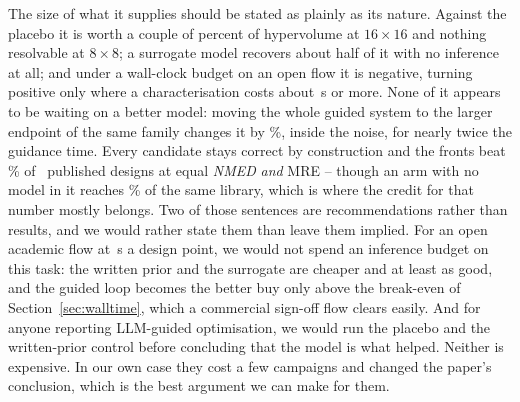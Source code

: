 \documentclass[acmsmall,review,anonymous]{acmart}
\newcommand{\nmed}{\textit{NMED}}
\begin{document}
The size of what it supplies should be stated as plainly as its nature.
Against the placebo it is worth a couple of percent of hypervolume at
$16\times16$ and nothing resolvable at $8\times8$; a surrogate model recovers
about half of it with no inference at all; and under a wall-clock budget on an
open flow it is negative, turning positive only where a characterisation costs
about \BreakEvenNSGA\,s or more.  None of it appears to be waiting on a better
model: moving the whole guided system to the larger endpoint of the same family
changes it by \ProFull\%, inside the noise, for nearly twice the guidance time.  Every candidate stays correct by construction
and the fronts beat \SotaSixteenADP\% of \NrefSixteen\ published designs at
equal \nmed{} \emph{and} MRE -- though an arm with no model in it reaches
\SotaShamSixteenADP\% of the same library, which is where the credit for that
number mostly belongs.
Two of those sentences are recommendations rather than results, and we would
rather state them than leave them implied.  For an open academic flow at
\SecPerCircuitWide\,s a design point, we would not spend an inference budget on
this task: the written prior and the surrogate are cheaper and at least as good,
and the guided loop becomes the better buy only above the break-even of
Section~\ref{sec:walltime}, which a commercial sign-off flow clears easily.  And
for anyone reporting LLM-guided optimisation, we would run the placebo and the
written-prior control before concluding that the model is what helped.  Neither
is expensive.  In our own case they cost a few campaigns and changed the paper's
conclusion, which is the best argument we can make for them.



\end{document}
